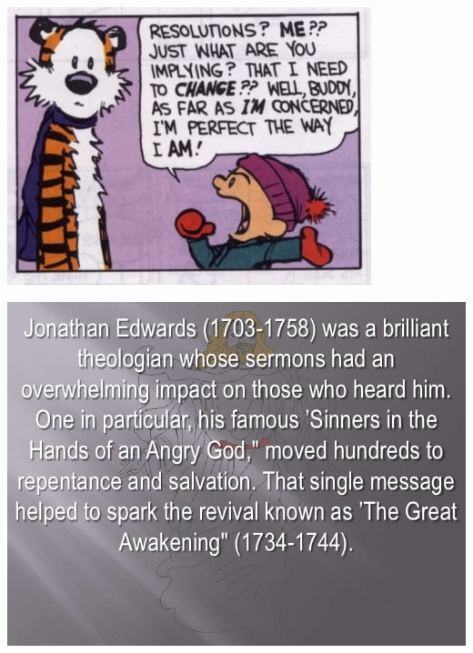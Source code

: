 \begin{frame}[label=sec-2-4]{}
\includegraphics[width=.9\linewidth]{./img/calvin-resolutions.jpg}
\end{frame}

\begin{frame}[label=sec-2-5]{}
\includegraphics[width=.9\linewidth]{./img/4-prepare-for-action-1-peter-11316-50-728.jpg}
\end{frame}

